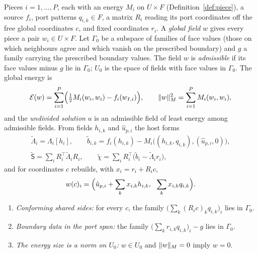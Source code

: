 \begin{definition}\label{def:superelement}
  \leanok
  Pieces $i=1,\dots,P$, each with an energy $M_i$ on $U\times F$
  (Definition~\ref{def:piece}), a source $f_i$, port patterns $q_{i,k}\in F$, a
  matrix $R_i$ reading its port coordinates off the free global coordinates
  $c$, and fixed coordinates $r_i$.  A \emph{global field} $w$ gives every
  piece a pair $w_i\in U\times F$.  Let $\Gamma_0$ be a subspace of families of
  face values (those on which neighbours agree and which vanish on the
  prescribed boundary) and $g$ a family carrying the prescribed boundary
  values.  The field $w$ is \emph{admissible} if its face values minus $g$ lie
  in $\Gamma_0$; $U_0$ is the space of fields with face values in $\Gamma_0$.
  The global energy is
  \[
    \mathcal E(w)=\sum_{i=1}^P\Bigl(\tfrac12M_i(w_i,w_i)-f_i(w_{I,i})\Bigr),
    \qquad\lVert w\rVert_M^2=\sum_{i=1}^PM_i(w_i,w_i),
  \]
  and the \emph{undivided solution} $u$ is an admissible field of least energy
  among admissible fields.  From fields $h_{i,k}$ and $\hat u_{p,i}$ the host
  forms
  \begin{gather*}
    \tilde\Lambda_i=\Lambda_i[h_i],\qquad
    \tilde b_{i,k}=f_i(h_{i,k})-M_i\bigl((h_{i,k},q_{i,k}),(\hat u_{p,i},0)\bigr),\\
    \tilde{\mathsf S}=\sum_iR_i^\top\tilde\Lambda_iR_i,\qquad
    \tilde\chi=\sum_iR_i^\top\bigl(\tilde b_i-\tilde\Lambda_ir_i\bigr),
  \end{gather*}
  and for coordinates $c$ rebuilds, with $x_i=r_i+R_ic$,
  \[
    w(c)_i=\Bigl(\hat u_{p,i}+\sum_kx_{i,k}h_{i,k},\ \ \sum_kx_{i,k}q_{i,k}\Bigr).
  \]
\end{definition}

\begin{definition}\label{def:assumptions}
  \leanok
  \begin{enumerate}
    \item \emph{Conforming shared sides:} for every $c$, the family
      $\bigl(\sum_k(R_ic)_kq_{i,k}\bigr)_i$ lies in $\Gamma_0$.
    \item \emph{Boundary data in the port span:} the family
      $\bigl(\sum_kr_{i,k}q_{i,k}\bigr)_i-g$ lies in $\Gamma_0$.
    \item \emph{The energy size is a norm on $U_0$:} $w\in U_0$ and
      $\lVert w\rVert_M=0$ imply $w=0$.
  \end{enumerate}
\end{definition}

